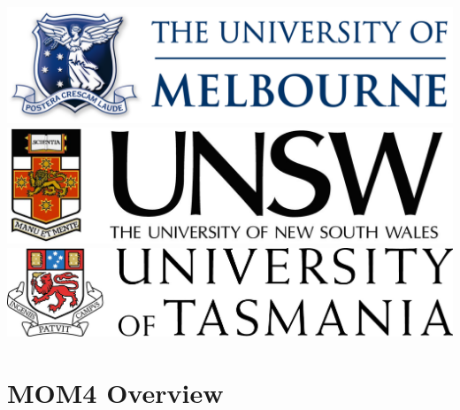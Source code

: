 \documentclass{beamer}
\begin{document}
\begin{frame}
\begin{textblock*}{\textwidth}
        \includegraphics[height=0.061\textheight]{umelb_logo.png}
        \hspace{0.02\textwidth}
        \includegraphics[height=0.061\textheight]{unsw_logo.jpg}
        \hspace{0.02\textwidth}
        \includegraphics[height=0.061\textheight]{utas_logo.jpg}
    \end{textblock*}
\end{frame}

\section[Overview]{MOM4 Overview}
\end{document}
